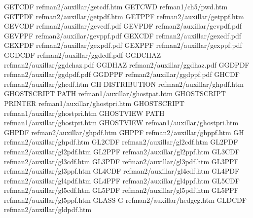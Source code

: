 GETCDF                                  refman2/auxillar/getcdf.htm
GETCWD                                  refman1/ch5/pwd.htm
GETPDF                                  refman2/auxillar/getpdf.htm
GETPPF                                  refman2/auxillar/getppf.htm
GEVCDF                                  refman2/auxillar/gevcdf.pdf
GEVPDF                                  refman2/auxillar/gevpdf.pdf
GEVPPF                                  refman2/auxillar/gevppf.pdf
GEXCDF                                  refman2/auxillar/gexcdf.pdf
GEXPDF                                  refman2/auxillar/gexpdf.pdf
GEXPPF                                  refman2/auxillar/gexppf.pdf
GGDCDF                                  refman2/auxillar/ggdcdf.pdf
GGDCHAZ                                 refman2/auxillar/ggdchaz.pdf
GGDHAZ                                  refman2/auxillar/ggdhaz.pdf
GGDPDF                                  refman2/auxillar/ggdpdf.pdf
GGDPPF                                  refman2/auxillar/ggdppf.pdf
GHCDF                                   refman2/auxillar/ghcdf.htm
GH DISTRIBUTION                         refman2/auxillar/ghpdf.htm
GHOSTSCRIPT PATH                        refman1/auxillar/ghostpat.htm
GHOSTSCRIPT PRINTER                     refman1/auxillar/ghostpri.htm
GHOSTSCRIPT                             refman1/auxillar/ghostpri.htm
GHOSTVIEW PATH                          refman1/auxillar/ghostpri.htm
GHOSTVIEW                               refman1/auxillar/ghostpri.htm
GHPDF                                   refman2/auxillar/ghpdf.htm
GHPPF                                   refman2/auxillar/ghppf.htm
GH                                      refman2/auxillar/ghpdf.htm
GL2CDF                                  refman2/auxillar/gl2cdf.htm
GL2PDF                                  refman2/auxillar/gl2pdf.htm
GL2PPF                                  refman2/auxillar/gl2ppf.htm
GL3CDF                                  refman2/auxillar/gl3cdf.htm
GL3PDF                                  refman2/auxillar/gl3pdf.htm
GL3PPF                                  refman2/auxillar/gl3ppf.htm
GL4CDF                                  refman2/auxillar/gl4cdf.htm
GL4PDF                                  refman2/auxillar/gl4pdf.htm
GL4PPF                                  refman2/auxillar/gl4ppf.htm
GL5CDF                                  refman2/auxillar/gl5cdf.htm
GL5PDF                                  refman2/auxillar/gl5pdf.htm
GL5PPF                                  refman2/auxillar/gl5ppf.htm
GLASS G                                 refman2/auxillar/hedgeg.htm
GLDCDF                                  refman2/auxillar/gldpdf.htm
